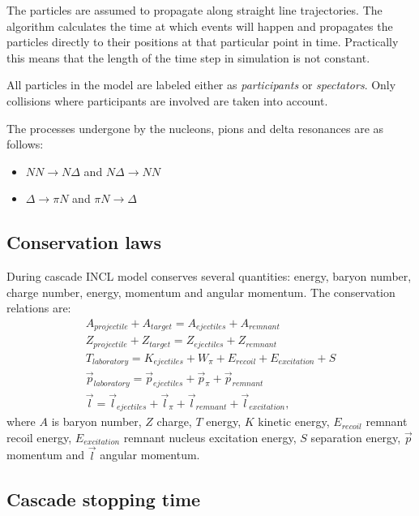 The particles are assumed to propagate along straight line
trajectories.  The algorithm calculates the time at which events will
happen and propagates the particles directly to their positions at
that particular point in time. Practically this means that the length
of the time step in simulation is not constant.

All particles in the model are labeled either as \emph{participants}
or \emph{spectators}. Only collisions where participants are involved
are taken into account.

The processes undergone by the nucleons, pions and delta resonances
are as follows:
\begin{itemize}
\item $NN \rightarrow N \Delta$ and $N \Delta \rightarrow NN$ 
\item $\Delta \rightarrow \pi N$ and $\pi N \rightarrow \Delta$
\end{itemize}


\subsection{Conservation laws}

During cascade INCL model conserves several quantities: 
energy, baryon number, charge number, energy, momentum and angular momentum. 
The conservation relations are:
\begin{eqnarray}
A_{projectile} + A_{target} = A_{ejectiles} + A_{remnant} \\
Z_{projectile} + Z_{target} = Z_{ejectiles} + Z_{remnant} \\
T_{laboratory} = K_{ejectiles} + W_{\pi} + E_{recoil} + E_{excitation} + S \\  %
\vec{p}_{laboratory} = \vec{p}_{ejectiles} + \vec{p}_{\pi} +
\vec{p}_{remnant} \\
\vec{l} = \vec{l}_{ejectiles} + \vec{l}_{\pi} + \vec{l}_{remnant} +
\vec{l}_{excitation},
\end{eqnarray}
where
$A$ is baryon number, $Z$ charge, $T$ energy, $K$ kinetic energy,
$E_{recoil}$ remnant recoil energy, $E_{excitation}$ remnant nucleus
excitation energy, $S$ separation energy, $\vec{p}$ momentum and
$\vec{l}$ angular momentum.

\subsection{Cascade stopping time}

